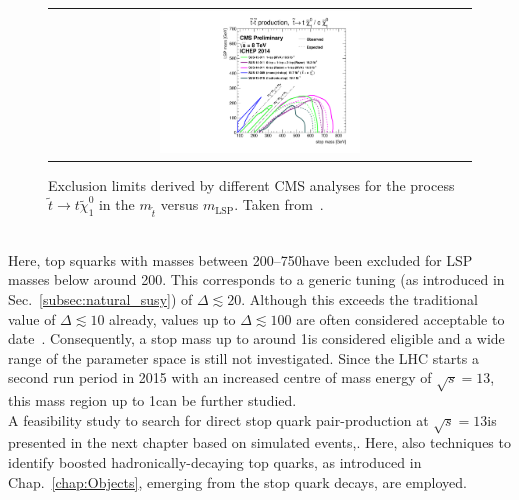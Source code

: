 \begin{figure}[!h]
  \centering
  \begin{tabular}{c}
                \includegraphics[width=0.49\textwidth]{figures/T2tt_ICHEP2014_All.pdf} 
  \end{tabular}
\caption{Exclusion limits derived by different CMS analyses for the process $\tilde{t} \rightarrow t\tilde{\chi}_1^0$ in the $m_{\tilde{t}}$ versus $m_\mathrm{LSP}$. Taken from~\cite{bib:CMS:PhysicsResultsSUS}.} 
  \label{fig:8TeV_stop_limits}
\end{figure}
\\
Here, top squarks with masses between 200--750\gev have been excluded for LSP masses below around 200\gev. This corresponds to a generic tuning (as introduced in Sec.~\ref{subsec:natural_susy}) of $\Delta \lesssim 20$. Although this exceeds the traditional value of $\Delta \lesssim 10$ already, values up to $\Delta \lesssim 100$ are often considered acceptable to date~\cite{Craig:2013cxa}. Consequently, a stop mass up to around 1\tev is considered eligible and a wide range of the parameter space is still not investigated. Since the LHC starts a second run period in 2015 with an increased centre of mass energy of $\sqrt{s} = 13$\tev, this mass region up to 1\tev can be further studied.\\
A feasibility study to search for direct stop quark pair-production at $\sqrt{s} = 13$\tev is presented in the next chapter based on simulated events,. Here, also techniques to identify boosted hadronically-decaying top quarks, as introduced in Chap.~\ref{chap:Objects}, emerging from the stop quark decays, are employed.
